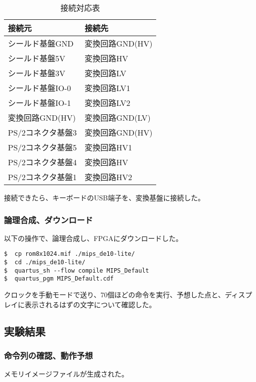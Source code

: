 \begin{table}[H]
  \centering
  \caption{接続対応表}
  \begin{tabular}{|l|l|}
    \hline
    接続元            & 接続先          \\ \hline \hline
    シールド基盤GND   & 変換回路GND(HV) \\ \hline
    シールド基盤5V    & 変換回路HV      \\ \hline
    シールド基盤3V    & 変換回路LV      \\ \hline
    シールド基盤IO-0  & 変換回路LV1     \\ \hline
    シールド基盤IO-1  & 変換回路LV2     \\ \hline
    変換回路GND(HV)   & 変換回路GND(LV) \\ \hline
    PS/2コネクタ基盤3 & 変換回路GND(HV) \\ \hline
    PS/2コネクタ基盤5 & 変換回路HV1     \\ \hline
    PS/2コネクタ基盤4 & 変換回路HV      \\ \hline
    PS/2コネクタ基盤1 & 変換回路HV2     \\ \hline
  \end{tabular}
\end{table}

接続できたら、キーボードのUSB端子を、変換基盤に接続した。


\subsubsection{論理合成、ダウンロード}
以下の操作で、論理合成し、FPGAにダウンロードした。
\begin{lstlisting}[caption={論理合成、ダウンロード},label={論理合成、ダウンロード6-1}]
$  cp rom8x1024.mif ./mips_de10-lite/
$  cd ./mips_de10-lite/
$  quartus_sh --flow compile MIPS_Default
$  quartus_pgm MIPS_Default.cdf
\end{lstlisting}

クロックを手動モードで送り、70個ほどの命令を実行、予想した点と、ディスプレイに表示されるはずの文字について確認した。

\subsection{実験結果}
\subsubsection{命令列の確認、動作予想}
メモリイメージファイルが生成された。
% 

